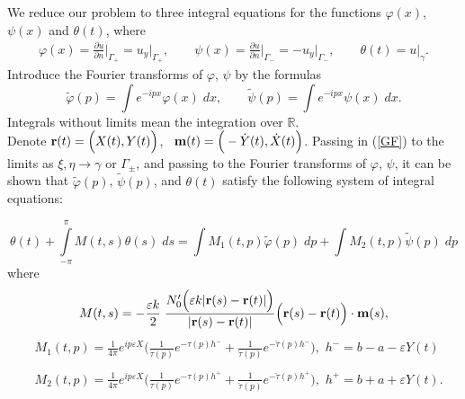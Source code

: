 \documentclass{beamer}
\newcommand{\ds}{\displaystyle}
\newcommand{\R}{\mathbb{R}}
\providecommand{\abs}[1]{\lvert#1\rvert}
\begin{document}
\begin{frame}
We  reduce our problem to three integral equations for the functions $\varphi(x)$, $\psi(x)$ and $\theta(t)$, where
\begin{align*}
 \varphi(x)=\ds\frac{\partial u}{\partial n}\Big\vert_{\Gamma_{+}}=u_{y}\Big\vert_{\Gamma_{+}},\qquad \psi(x)=\ds\frac{\partial u}{\partial n}\Big\vert_{\Gamma_{-}}=-u_{y}\Big\vert_{\Gamma_{-}}, \qquad
\theta(t)=u\Big\vert_{\gamma}.
\end{align*} 
 Introduce the Fourier transforms of $\varphi$, $\psi$ by the formulas
\begin{equation*}
\tilde{\varphi}(p)=\ds\int e^{-ipx} \varphi(x)\;dx,\qquad \tilde{\psi}(p)=\ds\int e^{-ipx} \psi(x)\;dx.
\end{equation*}
Integrals without limits mean the integration over $\R$.\\
Denote ${\bf r}(t)=\Big(X(t), Y(t)\Big)$,~ ${\bf m}(t)=\Big(-\dot{Y}(t),\dot{X}(t)\Big)$.
Passing in (\ref{GF}) to the limits as $\xi,\eta\to \gamma\text{ or } \Gamma_\pm$, and passing to the Fourier transforms of $\varphi$, $\psi$, it can be shown that    $\tilde{\varphi}(p)$, $\tilde{\psi}(p)$,  and $\theta(t)$ satisfy the following system of integral equations:
\end{frame}
\begin{frame}
\begin{equation}\label{theta+}
\theta(t)+\ds\int\limits_{-\pi}^{\pi} M(t,s) \theta(s)\; ds=\ds\int M_1(t,p)\tilde{\varphi}(p)\;dp+\ds\int M_2(t,p)\tilde{\psi}(p)\;dp
\end{equation}
where
\begin{equation}\label{M1}
M(t,s)=-\ds\frac{\varepsilon k}{2}\;\ds\frac{N'_0\Big(\varepsilon k\abs{{\bf r}(s)-{\bf r}(t)}\Big)}{\abs{{\bf r}(s)-{\bf r}(t)}}\Big({\bf r}(s)-{\bf r}(t)\Big)\cdot {\bf m}(s),
\end{equation}
\begin{align}\label{KM1}
& M_1(t,p)=\ds\frac{1}{4\pi} e^{ip\varepsilon X}\Bigg(\ds\frac{1}{\tau(p)} e^{-\tau(p)h^{-}}+\ds\frac{1}{\check{\tau}(p)} e^{-\check{\tau}(p)h^{-}}\Bigg),\,\, h^{-}=b-a-\varepsilon Y(t)\\\nonumber\\\label{KM2}
& M_2(t,p)=\ds\frac{1}{4\pi} e^{ip\varepsilon X}\Bigg(\ds\frac{1}{\tau(p)} e^{-\tau(p)h^{+}}+\ds\frac{1}{\check{\tau}(p)} e^{-\check{\tau}(p)h^{+}}\Bigg),\,\, h^{+}=b+a+\varepsilon Y(t).
\end{align}

\end{frame}
\end{document}
